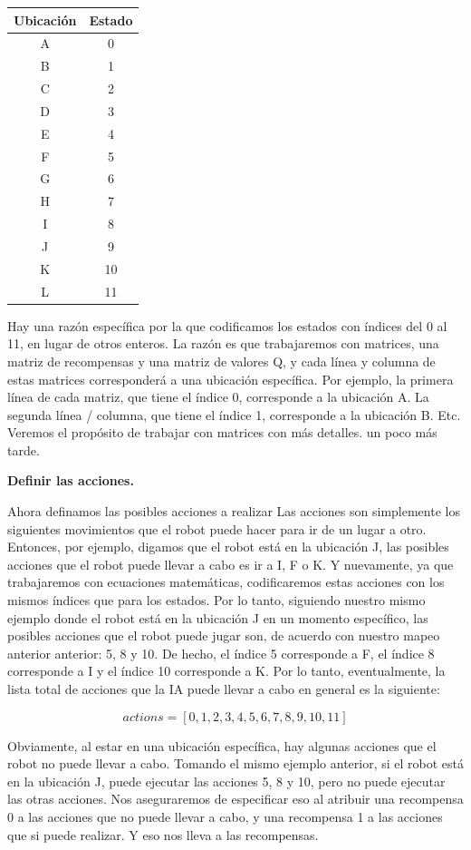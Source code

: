 \documentclass[
]{book}
\begin{document}
\begin{longtable}[]{@{}cc@{}}
\toprule()
\textbf{Ubicación} & \textbf{Estado} \\
\midrule()
\endhead
A & 0 \\
B & 1 \\
C & 2 \\
D & 3 \\
E & 4 \\
F & 5 \\
G & 6 \\
H & 7 \\
I & 8 \\
J & 9 \\
K & 10 \\
L & 11 \\
\bottomrule()
\end{longtable}

Hay una razón específica por la que codificamos los estados con índices del 0 al 11, en lugar de otros enteros. La razón es que trabajaremos con matrices, una matriz de recompensas y una matriz de valores Q, y cada línea y columna de estas matrices corresponderá a una ubicación específica. Por ejemplo, la primera línea de cada matriz, que tiene el índice 0, corresponde a la ubicación A. La segunda línea / columna, que tiene el índice 1, corresponde a la ubicación B. Etc. Veremos el propósito de trabajar con matrices con más detalles. un poco más tarde.

\textbf{Definir las acciones.}

Ahora definamos las posibles acciones a realizar Las acciones son simplemente los siguientes movimientos que el robot puede hacer para ir de un lugar a otro. Entonces, por ejemplo, digamos que el robot está en la ubicación J, las posibles acciones que el robot puede llevar a cabo es ir a I, F o K. Y nuevamente, ya que trabajaremos con ecuaciones matemáticas, codificaremos estas acciones con los mismos índices que para los estados. Por lo tanto, siguiendo nuestro mismo ejemplo donde el robot está en la ubicación J en un momento específico, las posibles acciones que el robot puede jugar son, de acuerdo con nuestro mapeo anterior anterior: 5, 8 y 10. De hecho, el índice 5 corresponde a F, el índice 8 corresponde a I y el índice 10 corresponde a K. Por lo tanto, eventualmente, la lista total de acciones que la IA puede llevar a cabo en general es la siguiente:

\[actions = [0,1,2,3,4,5,6,7,8,9,10,11]\]

Obviamente, al estar en una ubicación específica, hay algunas acciones que el robot no puede llevar a cabo. Tomando el mismo ejemplo anterior, si el robot está en la ubicación J, puede ejecutar las acciones 5, 8 y 10, pero no puede ejecutar las otras acciones. Nos aseguraremos de especificar eso al atribuir una recompensa 0 a las acciones que no puede llevar a cabo, y una recompensa 1 a las acciones que si puede realizar. Y eso nos lleva a las recompensas.
\end{document}
